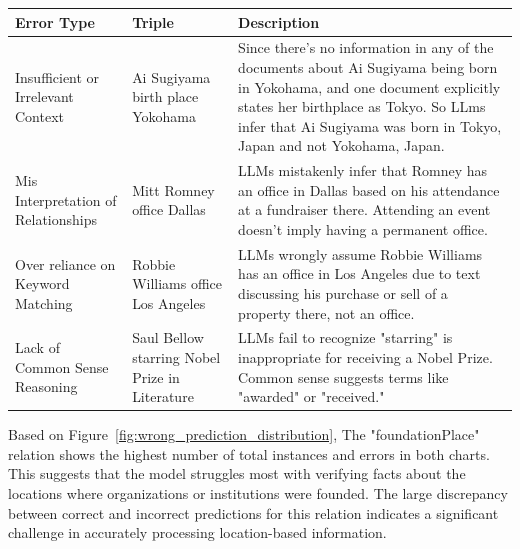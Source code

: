 \begin{table}[h!]
    \footnotesize
    \caption{Overview of failure cases and error analysis observed in the FactBench dataset.}
    \begin{xltabular}{\linewidth}{p{3cm}p{3cm}X}
        \toprule
        \textbf{Error Type} & \textbf{Triple} & \textbf{Description} \\
        \midrule
        Insufficient or Irrelevant Context & Ai Sugiyama birth place Yokohama & Since there's no information in any of the documents about Ai Sugiyama being born in Yokohama, and one document explicitly states her birthplace as Tokyo. So LLms infer that Ai Sugiyama was born in Tokyo, Japan and not Yokohama, Japan. \\
        Mis Interpretation of Relationships & Mitt Romney office Dallas & LLMs mistakenly infer that Romney has an office in Dallas based on his attendance at a fundraiser there. Attending an event doesn't imply having a permanent office. \\
        Over reliance on Keyword Matching & Robbie Williams office Los Angeles & LLMs wrongly assume Robbie Williams has an office in Los Angeles due to text discussing his purchase or sell of a property there, not an office. \\
        Lack of Common Sense Reasoning & Saul Bellow starring Nobel Prize in Literature & LLMs fail to recognize "starring" is inappropriate for receiving a Nobel Prize. Common sense suggests terms like "awarded" or "received." \\
        \bottomrule
    \end{xltabular}
    \label{tab:factbench-failure-analysis}
\end{table}

Based on Figure~\ref{fig:wrong_prediction_distribution}, The "foundationPlace" relation shows the highest number of total instances and errors in both charts.
This suggests that the model struggles most with verifying facts about the locations where organizations or institutions were founded.
The large discrepancy between correct and incorrect predictions for this relation indicates a significant challenge in accurately processing location-based information.

